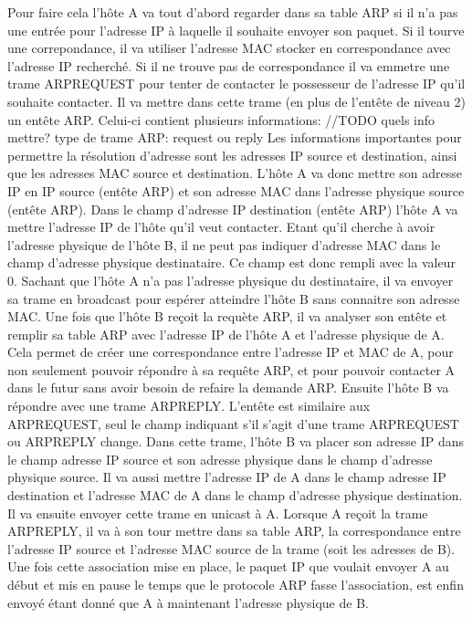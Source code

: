 \documentclass[twoside,openright,a4paper,11pt,french]{article}
\begin{document}
Pour faire cela l'hôte A va tout d'abord regarder dans sa table ARP si il n'a pas une entrée pour l'adresse IP à laquelle il souhaite envoyer son paquet. Si il tourve une correpondance, il va utiliser l'adresse MAC stocker en correspondance avec l'adresse IP recherché.
Si il ne trouve pas de correspondance il va emmetre une trame ARPREQUEST pour tenter de contacter le possesseur de l'adresse IP qu'il souhaite contacter. Il va mettre dans cette trame (en plus de l'entête de niveau 2) un entête ARP. Celui-ci contient plusieurs informations:
//TODO quels info mettre? type de trame ARP: request ou reply
Les informations importantes pour permettre la résolution d'adresse sont les adresses IP source et destination, ainsi que les adresses MAC source et destination.
L'hôte A va donc mettre son adresse IP en IP source (entête ARP) et son adresse MAC dans l'adresse physique source (entête ARP). Dans le champ d'adresse IP destination (entête ARP) l'hôte A va mettre l'adresse IP de l'hôte qu'il veut contacter. Etant qu'il cherche à avoir l'adresse physique de l'hôte B, il ne peut pas indiquer d'adresse MAC dans le champ d'adresse physique destinataire. Ce champ est donc rempli avec la valeur 0.
Sachant que l'hôte A n'a pas l'adresse physique du destinataire, il va envoyer sa trame en broadcast pour espérer atteindre l'hôte B sans connaitre son adresse MAC.
Une fois que l'hôte B reçoit la requète ARP, il va analyser son entête et remplir sa table ARP avec l'adresse IP de l'hôte A et l'adresse physique de A. Cela permet de créer une correspondance entre l'adresse IP et MAC de A, pour non seulement pouvoir répondre à sa requête ARP, et pour pouvoir contacter A dans le futur sans avoir besoin de refaire la demande ARP.
Ensuite l'hôte B va répondre avec une trame ARPREPLY. L'entête est similaire aux ARPREQUEST, seul le champ indiquant s'il s'agit d'une trame ARPREQUEST ou ARPREPLY change. Dans cette trame, l'hôte B va placer son adresse IP dans le champ adresse IP source et son adresse physique dans le champ d'adresse physique source. Il va aussi mettre l'adresse IP de A dans le champ adresse IP destination et l'adresse MAC de A dans le champ d'adresse physique destination. Il va ensuite envoyer cette trame en unicast à A.
Lorsque A reçoit la trame ARPREPLY, il va à son tour mettre dans sa table ARP, la correspondance entre l'adresse IP source et l'adresse MAC source de la trame (soit les adresses de B).
Une fois cette association mise en place, le paquet IP que voulait envoyer A au début et mis en pause le temps que le protocole ARP fasse l'association, est enfin envoyé étant donné que A à maintenant l'adresse physique de B.
\end{document}
